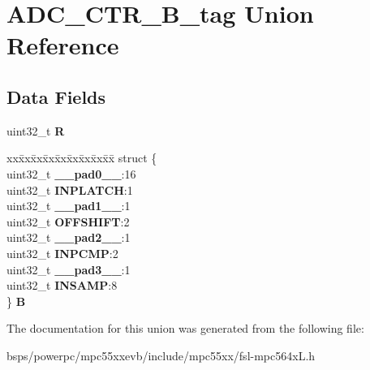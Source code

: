 \hypertarget{unionADC__CTR__32B__tag}{}\section{A\+D\+C\+\_\+\+C\+T\+R\+\_\+B\+\_\+tag Union Reference}
\label{unionADC__CTR__32B__tag}
\subsection*{Data Fields}
\begin{DoxyCompactItemize}
\item 
\mbox{\label{unionADC__CTR__32B__tag_a7a24b9a734fb8e8bb69eeaa20797204f}} 
uint32\+\_\+t {\bfseries R}
\item 
\mbox{\label{unionADC__CTR__32B__tag_ad25ba22f7783dd4160c7ed0289b6d1e7}} 
\begin{tabbing}
xx\=xx\=xx\=xx\=xx\=xx\=xx\=xx\=xx\=\kill
struct \{\\
\>uint32\_t {\bfseries \_\_pad0\_\_}:16\\
\>uint32\_t {\bfseries INPLATCH}:1\\
\>uint32\_t {\bfseries \_\_pad1\_\_}:1\\
\>uint32\_t {\bfseries OFFSHIFT}:2\\
\>uint32\_t {\bfseries \_\_pad2\_\_}:1\\
\>uint32\_t {\bfseries INPCMP}:2\\
\>uint32\_t {\bfseries \_\_pad3\_\_}:1\\
\>uint32\_t {\bfseries INSAMP}:8\\
\} {\bfseries B}\\

\end{tabbing}\end{DoxyCompactItemize}


The documentation for this union was generated from the following file\+:\begin{DoxyCompactItemize}
\item 
bsps/powerpc/mpc55xxevb/include/mpc55xx/fsl-\/mpc564x\+L.\+h\end{DoxyCompactItemize}
